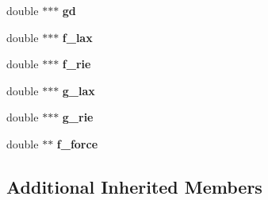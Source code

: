 \begin{DoxyCompactItemize}
\item 
\hypertarget{classForce_aee959ad673ab398cc8309322ae42ecd2}{double $\ast$$\ast$$\ast$ {\bfseries gd}}\label{classForce_aee959ad673ab398cc8309322ae42ecd2}

\item 
\hypertarget{classForce_afc58bdb5903d6eafa1740ad762c8b214}{double $\ast$$\ast$$\ast$ {\bfseries f\-\_\-lax}}\label{classForce_afc58bdb5903d6eafa1740ad762c8b214}

\item 
\hypertarget{classForce_a4a43242ebf85eb2d603ea444ec243f8a}{double $\ast$$\ast$$\ast$ {\bfseries f\-\_\-rie}}\label{classForce_a4a43242ebf85eb2d603ea444ec243f8a}

\item 
\hypertarget{classForce_aca3165e40a8789286d288659b7309d28}{double $\ast$$\ast$$\ast$ {\bfseries g\-\_\-lax}}\label{classForce_aca3165e40a8789286d288659b7309d28}

\item 
\hypertarget{classForce_a8f97242d9677a2023e82f906fce096ab}{double $\ast$$\ast$$\ast$ {\bfseries g\-\_\-rie}}\label{classForce_a8f97242d9677a2023e82f906fce096ab}

\item 
\hypertarget{classForce_a192a91d08a845804c681ddfb06b131e3}{double $\ast$$\ast$ {\bfseries f\-\_\-force}}\label{classForce_a192a91d08a845804c681ddfb06b131e3}

\end{DoxyCompactItemize}
\subsection*{Additional Inherited Members}


